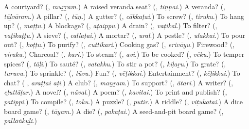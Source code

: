 \begin{tcolorbox}[breakable,colback=teal!4,colframe=teal!35!black,title={Before you move on}]
A courtyard? (\textbf{}, \emph{muṟṟam}.) A raised veranda seat? (\textbf{}, \emph{tiṇṇai}.) A veranda? (\textbf{}, \emph{tāḻvāram}.) A pillar? (\textbf{}, \emph{tūṇ}.) A gutter? (\textbf{}, \emph{cākkaṭai}.) To screw? (\textbf{}, \emph{tiruku}.) To hang up? (\textbf{}, \emph{māṭṭu}.) A blockage? (\textbf{}, \emph{aṭaippu}.) A drain? (\textbf{}, \emph{vaṭikāl}.) To filter? (\textbf{}, \emph{vaṭikaṭṭu}.) A sieve? (\textbf{}, \emph{callaṭai}.) A mortar? (\textbf{}, \emph{ural}.) A pestle? (\textbf{}, \emph{ulakkai}.) To pour out? (\textbf{}, \emph{koṭṭu}.) To purify? (\textbf{}, \emph{cuttikari}.) Cooking gas? (\textbf{}, \emph{erivāyu}.) Firewood? (\textbf{}, \emph{viṟaku}.) Charcoal? (\textbf{}, \emph{kari}.) To steam? (\textbf{}, \emph{avi}.) To be cooked? (\textbf{}, \emph{vēku}.) To temper spices? (\textbf{}, \emph{tāḷi}.) To sauté? (\textbf{}, \emph{vatakku}.) To stir a pot? (\textbf{}, \emph{kiḷaṟu}.) To grate? (\textbf{}, \emph{turuvu}.) To sprinkle? (\textbf{}, \emph{tūvu}.) Fun? (\textbf{}, \emph{vēṭikkai}.) Entertainment? (\textbf{}, \emph{kēḷikkai}.) To chat? (\textbf{ }, \emph{araṭṭai aṭi}.) A club? (\textbf{}, \emph{maṉṟam}.) To support? (\textbf{}, \emph{ātari}.) A writer? (\textbf{}, \emph{eḻuttāḷar}.) A novel? (\textbf{}, \emph{nāval}.) A poem? (\textbf{}, \emph{kavitai}.) To print and publish? (\textbf{}, \emph{patippi}.) To compile? (\textbf{}, \emph{toku}.) A puzzle? (\textbf{}, \emph{putir}.) A riddle? (\textbf{}, \emph{viṭukatai}.) A dice board game? (\textbf{}, \emph{tāyam}.) A die? (\textbf{}, \emph{pakaṭai}.) A seed-and-pit board game? (\textbf{}, \emph{pallāṅkuḻi}.)
\end{tcolorbox}
